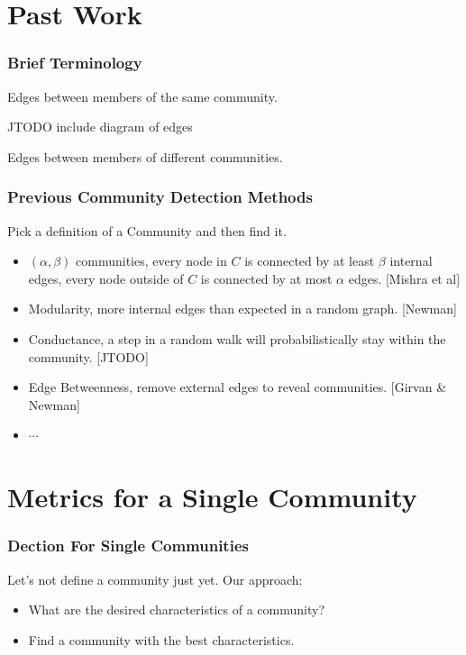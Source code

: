 \documentclass{beamer}
\begin{document}
\section{Past Work}


\begin{frame}\frametitle{Brief Terminology}

\begin{definition}
Edges between members of the same community.
\end{definition}
JTODO include diagram of edges
\begin{definition}
Edges between members of different communities.
\end{definition}
\end{frame}


\begin{frame}\frametitle{Previous Community Detection Methods}

Pick a definition of a Community and then find it.
\begin{itemize}
\item $(\alpha, \beta)$ communities, every node in $C$ is connected by at least $\beta$ internal edges, every node outside of $C$ is connected by at most $\alpha$ edges. [Mishra et al]
\item Modularity, more internal edges than expected in a random graph. [Newman]
\item Conductance, a step in a random walk will probabilistically stay within the community. [JTODO]
\item Edge Betweenness, remove external edges to reveal communities. [Girvan \& Newman]
\item $\cdots$
\end{itemize}

\end{frame}


\section{Metrics for a Single Community}


\begin{frame}\frametitle{Dection For Single Communities}
Let's not define a community just yet.
\newline
\newline
Our approach:
\begin{itemize}
\item What are the desired characteristics of a community?
\item Find a community with the best characteristics.
\end{itemize}

\end{frame}
\end{document}
